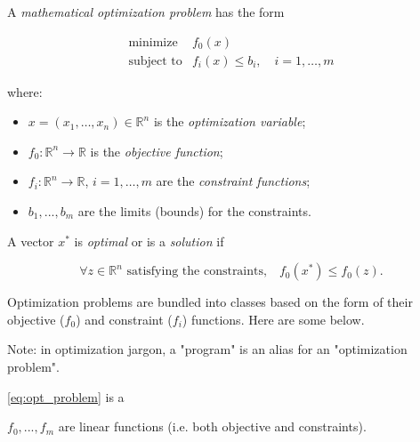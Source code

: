 \message{ !name(document.tex)}\documentclass[twocolumn]{article}
\begin{document}



A \textit{mathematical optimization problem} has the form

\begin{equation*}\label{eq:opt_problem}
  \begin{array}{rl}
    \text{minimize} & f_0(x) \\
    \text{subject to} & f_i(x)\le b_i,\quad i=1,\ldots,m
  \end{array}
\end{equation*}

where:

\begin{itemize}
\item $x=(x_1,\ldots,x_n)\in\mathbb R^n$ is the \textit{optimization variable};
\item $f_0:\mathbb R^n\to\mathbb R$ is the \textit{objective function};
\item $f_i:\mathbb R^n\to \mathbb R$, $i=1,\ldots,m$ are the \textit{constraint functions};
\item $b_1,...,b_m$ are the limits (bounds) for the constraints.
\end{itemize}

A vector $x^*$ is \textit{optimal} or is a \textit{solution} if

\begin{equation*}
  \forall z\in\mathbb R^n\text{ satisfying the constraints,}\quad f_0(x^*)\le f_0(z).
\end{equation*}


Optimization problems are bundled into classes based on the form of their objective ($f_0$) and constraint ($f_i$) functions. Here are some below.

\begin{Fact}
  Note: in optimization jargon, a "program" is an alias for an "optimization problem".
\end{Fact}


\begin{Definition}
  \ref{eq:opt_problem} is a  
\end{Definition}

$f_0,...,f_m$ are linear functions (i.e. both objective and constraints).
\end{document}

